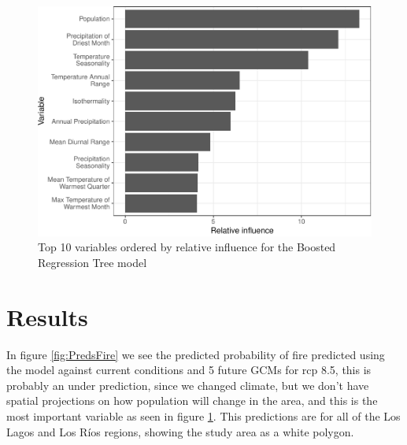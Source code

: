 \documentclass[
]{article}
\begin{document}
\begin{figure}
\centering
\includegraphics{Methods_files/figure-latex/VarImp-1.pdf}
\caption{\label{fig:VarImp}Top 10 variables ordered by relative influence for the Boosted Regression Tree model}
\end{figure}

\hypertarget{results}{%
\section{Results}\label{results}}

In figure \ref{fig:PredsFire} we see the predicted probability of fire predicted using the model against current conditions and 5 future GCMs for rcp 8.5, this is probably an under prediction, since we changed climate, but we don't have spatial projections on how population will change in the area, and this is the most important variable as seen in figure \ref{fig:VarImp}. This predictions are for all of the Los Lagos and Los Ríos regions, showing the study area as a white polygon.
\end{document}

